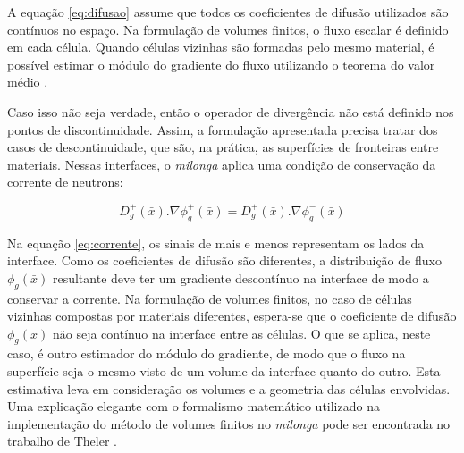 A equação \ref{eq:difusao} assume que todos os coeficientes de difusão utilizados são
contínuos no espaço. Na formulação de volumes finitos,
o fluxo escalar é definido em cada célula. Quando células vizinhas são formadas
pelo mesmo material, é possível estimar o módulo do gradiente do fluxo
utilizando o teorema do valor médio \cite{Theler2013b}.

Caso isso não seja verdade, então o operador de divergência não
está definido nos pontos de discontinuidade. Assim, a formulação apresentada precisa tratar
dos casos de descontinuidade, que são, na prática, as superfícies de fronteiras entre
materiais. Nessas interfaces, o \textit{milonga} aplica uma condição de
conservação da corrente de neutrons:

\begin{equation}
  \label{eq:corrente}
  D_g^+(\bar{x}).\nabla \phi_g^+(\bar{x})=D_g^+(\bar{x}).\nabla \phi_g^-(\bar{x})
  \end{equation}

Na equação \ref{eq:corrente}, os sinais de mais e menos representam os lados da
interface. Como os coeficientes de difusão são diferentes, a distribuição de
fluxo $\phi_g(\bar{x})$ resultante deve ter um gradiente descontínuo na
interface de modo a conservar a corrente. Na formulação de volumes finitos,
no caso de células vizinhas compostas por materiais diferentes, espera-se que
o coeficiente de difusão $\phi_g(\bar{x})$ não seja contínuo na interface
entre as células. O que se aplica, neste caso, é outro estimador do módulo
do gradiente, de modo que o fluxo na superfície seja o mesmo visto de um volume
da interface quanto do outro. Esta estimativa leva em consideração os volumes e
a geometria das células envolvidas. Uma explicação elegante com o formalismo
matemático utilizado na implementação do método de volumes finitos no
\textit{milonga} pode ser encontrada no trabalho de Theler \cite[Seção 3.5.2]{Theler2016}.





